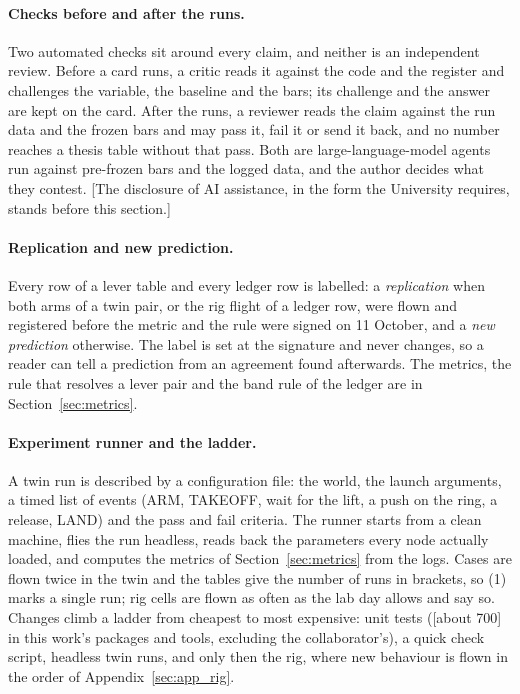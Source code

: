 \paragraph{Checks before and after the runs.} Two automated checks sit around every claim, and neither is an
independent review. Before a card runs, a critic reads it against the code and the register and challenges the
variable, the baseline and the bars; its challenge and the answer are kept on the card. After the runs, a reviewer
reads the claim against the run data and the frozen bars and may pass it, fail it or send it back, and no number
reaches a thesis table without that pass. Both are large-language-model agents run against pre-frozen bars and
the logged data, and the author decides what they contest. [The disclosure of AI assistance, in the form the
University requires, stands before this section.]

\paragraph{Replication and new prediction.} Every row of a lever table and every ledger row is labelled: a
\emph{replication} when both arms of a twin pair, or the rig flight of a ledger row, were flown and registered
before the metric and the rule were signed on 11 October, and a \emph{new prediction} otherwise. The label is set
at the signature and never changes, so a reader can tell a prediction from an agreement found afterwards. The
metrics, the rule that resolves a lever pair and the band rule of the ledger are in Section~\ref{sec:metrics}.

\paragraph{Experiment runner and the ladder.} A twin run is described by a configuration file: the world, the
launch arguments, a timed list of events (ARM, TAKEOFF, wait for the lift, a push on the ring, a release, LAND)
and the pass and fail criteria. The runner starts from a clean machine, flies the run headless, reads back the
parameters every node actually loaded, and computes the metrics of Section~\ref{sec:metrics} from the logs. Cases
are flown twice in the twin and the tables give the number of runs in brackets, so (1) marks a single run; rig
cells are flown as often as the lab day allows and say so. Changes climb a ladder from cheapest to most expensive:
unit tests ([about 700] in this work's packages and tools, excluding the collaborator's), a quick check script,
headless twin runs, and only then the rig, where new behaviour is flown in the order of
Appendix~\ref{sec:app_rig}.
